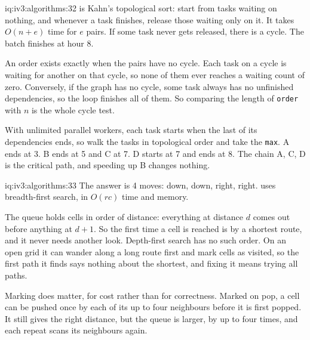 \begin{solution}{iq:iv3:algorithms:32}
 is Kahn's topological sort: start from tasks waiting on nothing, and whenever a task finishes, release those waiting only on it. It takes $O(n + e)$ time for $e$ pairs. If some task never gets released, there is a cycle. The batch finishes at hour 8.
\label{lst:iv3:al:topo}

An order exists exactly when the pairs have no cycle. Each task on a cycle is waiting for another on that cycle, so none of them ever reaches a waiting count of zero. Conversely, if the graph has no cycle, some task always has no unfinished dependencies, so the loop finishes all of them. So comparing the length of \texttt{order} with $n$ is the whole cycle test.

With unlimited parallel workers, each task starts when the last of its dependencies ends, so walk the tasks in topological order and take the \texttt{max}. A ends at 3. B ends at 5 and C at 7. D starts at 7 and ends at 8. The chain A, C, D is the critical path, and speeding up B changes nothing.

\end{solution}

\begin{solution}{iq:iv3:algorithms:33}
The answer is 4 moves: down, down, right, right.  uses breadth-first search, in $O(rc)$ time and memory.
\enlargethispage{-3\baselineskip}%
\label{lst:iv3:al:grid}

The queue holds cells in order of distance: everything at distance $d$ comes out before anything at $d + 1$. So the first time a cell is reached is by a shortest route, and it never needs another look. Depth-first search has no such order. On an open grid it can wander along a long route first and mark cells as visited, so the first path it finds says nothing about the shortest, and fixing it means trying all paths.

Marking does matter, for cost rather than for correctness. Marked on pop, a cell can be pushed once by each of its up to four neighbours before it is first popped. It still gives the right distance, but the queue is larger, by up to four times, and each repeat scans its neighbours again.

\end{solution}

